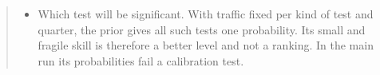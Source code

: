 \documentclass[sigconf,nonacm]{acmart}
\begin{document}
\begin{abstract}
\begin{itemize}
\item Which test will be significant. With traffic fixed per kind of test and quarter, the prior gives all such tests one probability. Its small and fragile skill is therefore a better level and not a ranking. In the main run its probabilities fail a calibration test.

\end{itemize}
\end{abstract}
\end{document}
